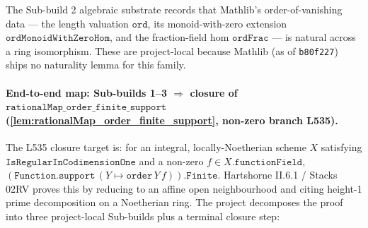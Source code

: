 The Sub-build 2 algebraic substrate records that Mathlib's order-of-vanishing
data --- the length valuation \(\texttt{ord}\), its monoid-with-zero extension
\(\texttt{ordMonoidWithZeroHom}\), and the fraction-field hom
\(\texttt{ordFrac}\) --- is natural across a ring isomorphism. These are
project-local because Mathlib (as of \texttt{b80f227}) ships no naturality
lemma for this family.


\paragraph{End-to-end map: Sub-builds 1--3 \(\Rightarrow\) closure of
\(\texttt{rationalMap\_order\_finite\_support}\) (\ref{lem:rationalMap_order_finite_support}, non-zero branch L535).}
The L535 closure target is: for an integral, locally-Noetherian scheme
\(X\) satisfying \(\texttt{IsRegularInCodimensionOne}\) and a non-zero
\(f \in X.\texttt{functionField}\),
\((\texttt{Function.support}\,(Y \mapsto \texttt{order}\,Y\,f)).\texttt{Finite}\).
Hartshorne II.6.1 / Stacks 02RV proves this by reducing to an
affine open neighbourhood and citing height-1 prime decomposition
on a Noetherian ring. The project decomposes the proof into three
project-local Sub-builds plus a terminal closure step:

